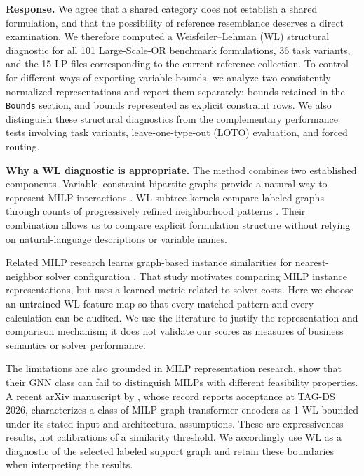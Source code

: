 \documentclass[11pt]{article}
\begin{document}
\begin{enumerate}[label=(AssoE.\arabic*),leftmargin=*]
\begingroup\color{replyblue}
\textbf{Response.} We agree that a shared category does not establish a shared
formulation, and that the possibility of reference resemblance deserves a
direct examination. We therefore computed a Weisfeiler--Lehman (WL)
structural diagnostic for all 101 Large-Scale-OR benchmark formulations,
36 task variants, and the 15 LP files corresponding to the current
reference collection. To control for different ways of exporting variable
bounds, we analyze two consistently normalized representations and report
them separately: bounds retained in the \texttt{Bounds} section, and bounds
represented as explicit constraint rows. We also distinguish these
structural diagnostics from the complementary performance tests involving
task variants, leave-one-type-out (LOTO) evaluation, and forced routing.

\medskip
\textbf{Why a WL diagnostic is appropriate.}
The method combines two established components. Variable--constraint
bipartite graphs provide a natural way to represent MILP interactions
\citep{Gasse2019}. WL subtree kernels compare labeled graphs through
counts of progressively refined neighborhood patterns
\citep{Shervashidze2011}. Their combination allows us to compare explicit
formulation structure without relying on natural-language descriptions
or variable names.

Related MILP research learns graph-based instance similarities for
nearest-neighbor solver configuration \citep{Hosny2024}. That study
motivates comparing MILP instance representations, but uses a learned
metric related to solver costs. Here we choose an untrained WL feature
map so that every matched pattern and every calculation can be audited.
We use the literature to justify the representation and comparison
mechanism; it does not validate our scores as measures of business
semantics or solver performance.

The limitations are also grounded in MILP representation research.
\citet{Chen2023} show that their GNN class can fail to distinguish MILPs
with different feasibility properties. A recent arXiv manuscript by
\citet{Jahin2026}, whose record reports acceptance at TAG-DS 2026,
characterizes a class of MILP graph-transformer encoders as 1-WL bounded
under its stated input and architectural assumptions. These are
expressiveness results, not calibrations of a similarity threshold.
We accordingly use WL as a diagnostic of the selected labeled support
graph and retain these boundaries when interpreting the results.


\end{enumerate}
\end{document}
